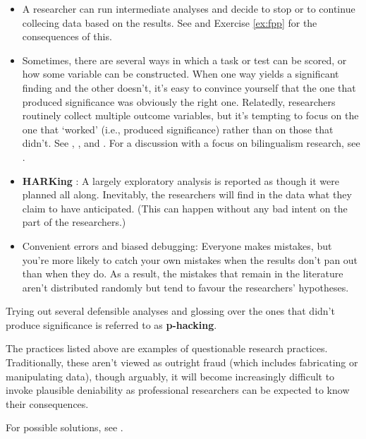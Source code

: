 \documentclass[a4paper]{tufte-book}\usepackage[]{graphicx}\usepackage[]{xcolor}
\newcommand{\term}[1]{\textbf{#1}}
\begin{document}
\begin{itemize}
  \item A researcher can run intermediate analyses 
  and decide to stop or to continue collecing data based on the results. 
  See \citet{Simmons2011} and Exercise \ref{ex:fpp} for the consequences of this.
  
  \item Sometimes, there are several ways in which a task or test can be
  scored, or how some variable can be constructed.
  When one way yields a significant finding and the other doesn't,
  it's easy to convince yourself that the one that produced significance
  was obviously the right one. 
  Relatedly, researchers routinely collect multiple outcome variables, but
  it's tempting to focus on the one that `worked' (i.e., produced significance)
  rather than on those that didn't.
  See \citet{Simmons2011},
  \citet{Gelman2013}, and 
  \citet{Malsburg2017}. For a discussion with a focus on bilingualism
  research, see \citet{Poarch2018}.
  
  \item \term{HARKing} \citep[hypothesizing after the results are known;][]{Kerr1998}: 
  A largely exploratory analysis is reported as though it were planned all along.
  Inevitably, the researchers will find in the data what they claim to have
  anticipated. (This can happen without any bad intent on the part of the
  researchers.)
  
  \item Convenient errors and biased debugging: 
  Everyone makes mistakes, but you're more likely to catch your own
  mistakes when the results don't pan out than when they do.
  As a result, the mistakes that remain in the literature aren't
  distributed randomly but tend to favour the researchers' hypotheses.
  
\end{itemize}

Trying out several defensible analyses and glossing over the ones
that didn't produce significance is referred to as \term{p-hacking}.

The practices listed above are examples of questionable research practices.
Traditionally, these aren't viewed as outright fraud (which includes 
fabricating or manipulating data), though arguably, it will become increasingly
difficult to invoke plausible deniability 
as professional researchers can be expected to know their consequences.

For possible solutions, see \citet{Chambers2017}.
\end{document}
